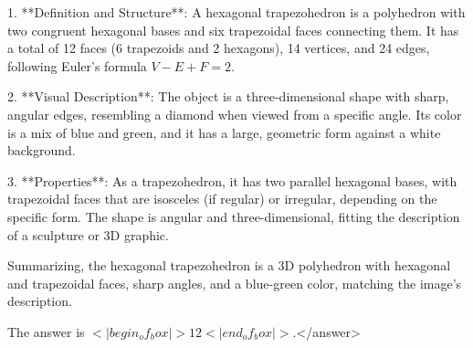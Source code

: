 1. **Definition and Structure**: A hexagonal trapezohedron is a polyhedron with two congruent hexagonal bases and six trapezoidal faces connecting them. It has a total of 12 faces (6 trapezoids and 2 hexagons), 14 vertices, and 24 edges, following Euler's formula \( V - E + F = 2 \).  

2. **Visual Description**: The object is a three-dimensional shape with sharp, angular edges, resembling a diamond when viewed from a specific angle. Its color is a mix of blue and green, and it has a large, geometric form against a white background.  

3. **Properties**: As a trapezohedron, it has two parallel hexagonal bases, with trapezoidal faces that are isosceles (if regular) or irregular, depending on the specific form. The shape is angular and three-dimensional, fitting the description of a sculpture or 3D graphic.  

Summarizing, the hexagonal trapezohedron is a 3D polyhedron with hexagonal and trapezoidal faces, sharp angles, and a blue-green color, matching the image's description.  

The answer is \(<|begin_of_box|>12<|end_of_box|>\).</answer>